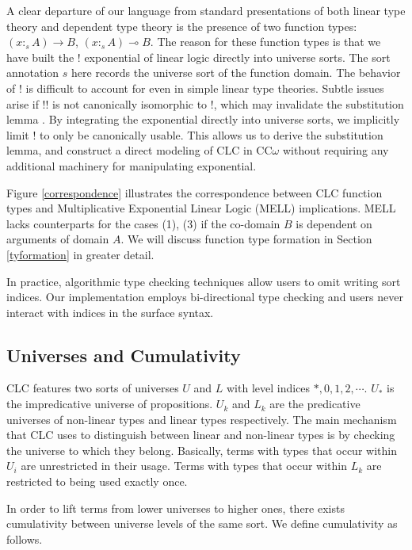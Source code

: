 \documentclass[sigplan,screen]{acmart}
\theoremstyle{definition}
\begin{document}
  A clear departure of our language from standard presentations of both linear type theory and dependent type theory is the presence of two function types: $(x :_s A) \rightarrow B$, $(x :_s A) \multimap B$. The reason for these function types is that we have built the ! exponential of linear logic directly into universe sorts. The sort annotation $s$ here records the universe sort of the function domain. The behavior of ! is difficult to account for even in simple linear type theories. Subtle issues arise if !! is not canonically isomorphic to !, which may invalidate the substitution lemma \cite{substitute}. By integrating the exponential directly into universe sorts, we implicitly limit ! to only be canonically usable. This allows us to derive the substitution lemma, and construct a direct modeling of CLC in CC$\omega$ without requiring any additional machinery for manipulating exponential.

  Figure \ref{correspondence} illustrates the correspondence between CLC function types and Multiplicative Exponential Linear Logic (MELL) implications. MELL lacks counterparts for the cases (1), (3) if the co-domain $B$ is dependent on arguments of domain $A$. We will discuss function type formation in Section \ref{tyformation} in greater detail.

  In practice, algorithmic type checking techniques allow users to omit writing sort indices. Our implementation employs bi-directional type checking and users never interact with indices in the surface syntax.

  \subsection{Universes and Cumulativity}
  CLC features two sorts of universes $U$ and $L$ with level indices $*, 0, 1, 2, \cdots$. $U_*$ is the impredicative universe of propositions. $U_k$ and $L_k$ are the predicative universes of non-linear types and linear types respectively. The main mechanism that CLC uses to distinguish between linear and non-linear types is by checking the universe to which they belong. Basically, terms with types that occur within $U_i$ are unrestricted in their usage. Terms with types that occur within $L_k$ are restricted to being used exactly once.

  In order to lift terms from lower universes to higher ones, there exists cumulativity between universe levels of the same sort. We define cumulativity as follows.
\end{document}
